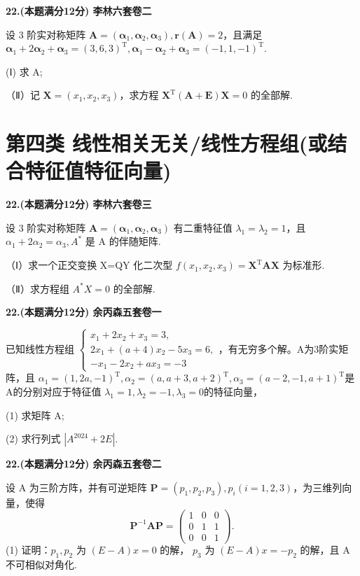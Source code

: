 \documentclass[a4paper,12pt]{article}
\begin{document}
\textbf{22.(本题满分12分) 李林六套卷二}

设 3 阶实对称矩阵 $\boldsymbol{A}=(\boldsymbol{\alpha}_{1},\boldsymbol{\alpha}_{2},\boldsymbol{\alpha}_{3}),\boldsymbol{r}(\boldsymbol{A})=2$，且满足 $\boldsymbol{\alpha}_{1}+2\boldsymbol{\alpha}_{2}+\boldsymbol{\alpha}_{3}=(3,6,3)^{\mathrm{T}},\boldsymbol{\alpha}_{1}-\boldsymbol{\alpha}_{2}+\boldsymbol{\alpha}_{3}=(-1,1,-1)^{\mathrm{T}}$.

(Ⅰ) 求 A;

（Ⅱ）记 $\boldsymbol{X}=(x_{1},x_{2},x_{3})$，求方程 $\boldsymbol{X}^{\mathrm{T}}(\boldsymbol{A}+\boldsymbol{E})\boldsymbol{X}=0$ 的全部解.

\section{第四类 线性相关无关/线性方程组(或结合特征值特征向量)}

\textbf{22.(本题满分12分) 李林六套卷三}

设 3 阶实对称矩阵 $\boldsymbol{A}=(\boldsymbol{\alpha}_{1},\boldsymbol{\alpha}_{2},\boldsymbol{\alpha}_{3})$ 有二重特征值 $\lambda_{1}=\lambda_{2}=1$，且 $\alpha_{1}+2\alpha_{2}=\alpha_{3}, A^{*}$ 是 A 的伴随矩阵.

（Ⅰ）求一个正交变换 X=QY 化二次型 $f(x_{1},x_{2},x_{3})=\boldsymbol{X}^{\mathrm{T}}\boldsymbol{A}\boldsymbol{X}$ 为标准形.

（Ⅱ）求方程组 $A^{*}X=0$ 的全部解.

\vspace{0.5cm}

\textbf{22.(本题满分12分) 余丙森五套卷一}

已知线性方程组 $\begin{cases}x_{1}+2x_{2}+x_{3}=3,\\2x_{1}+(a+4)x_{2}-5x_{3}=6,\\-x_{1}-2x_{2}+ax_{3}=-3\end{cases}$，有无穷多个解。A为3阶实矩阵，且 $\alpha_{1}=(1,2a,-1)^{\mathrm{T}},\alpha_{2}=(a,a+3,a+2)^{\mathrm{T}},\alpha_{3}=(a-2,-1,a+1)^{\mathrm{T}}$是A的分别对应于特征值 $\lambda_{1}=1,\lambda_{2}=-1,\lambda_{3}=0$的特征向量，

(1) 求矩阵 A;

(2) 求行列式 $\left|A^{2024}+2E\right|$.

\vspace{0.5cm}

\textbf{22.(本题满分12分) 余丙森五套卷二}

设 A 为三阶方阵，并有可逆矩阵 $\boldsymbol{P} = (p_{1}, p_{2}, p_{3}), p_{i} (i = 1, 2, 3)$，为三维列向量，使得
\[ \boldsymbol{P}^{-1}\boldsymbol{A}\boldsymbol{P}=\begin{pmatrix}{{{1}}}&{{{0}}}&{{{0}}} \\{{{0}}}&{{{1}}}&{{{1}}} \\{{{0}}}&{{{0}}}&{{{1}}}\end{pmatrix}. \]
(1) 证明：$p_{1}, p_{2}$ 为 $(E - A)x = 0$ 的解， $p_{3}$ 为 $(E - A)x = -p_{2}$ 的解，且 A 不可相似对角化.
\end{document}
